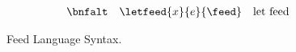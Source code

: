 \begin{figure}[t]
\[\begin{array}{lll}
 \bnfalt & \letfeed{x}{e}{\feed} & \mbox{let feed} \\
\end{array}
\]
\caption{Feed Language Syntax.}
\label{fig:syntax}
\shrink
\end{figure}

